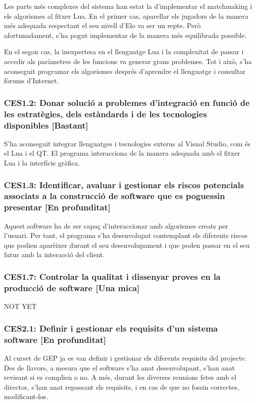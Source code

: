 \documentclass[a4paper]{article}
\begin{document}
Les parts més complexes del sistema han estat la d'implementar el matchmaking i els algorismes al fitxer Lua. En el primer cas, aparellar els jugadors de la manera més adequada respectant el seu nivell d'Elo va ser un repte. Però afortunadament, s'ha pogut implementar de la manera més equilibrada possible.

En el segon cas, la inexpertesa en el llenguatge Lua i la complexitat de passar i accedir als paràmetres de les funcions va generar grans problemes. Tot i això, s'ha aconseguit programar els algorismes després d'aprendre el llenguatge i consultar fòrums d'Internet.

\subsubsection*{CES1.2: Donar solució a problemes d'integració en funció de les estratègies, dels estàndards i de les tecnologies disponibles [Bastant]}

S'ha aconseguit integrar llenguatges i tecnologies externs al Visual Studio, com és el Lua i el QT. El programa interacciona de la manera adequada amb el fitxer Lua i la interfície gràfica. 

\subsubsection*{CES1.3: Identificar, avaluar i gestionar els riscos potencials associats a la construcció de software que es poguessin presentar [En profunditat]}

Aquest software ha de ser capaç d'interaccionar amb algorismes creats per l'usuari. Per tant, el programa s'ha desenvolupat contemplant els diferents riscos que podien aparèixer durant el seu desenvolupament i que poden passar en el seu futur amb la interacció del client.

\subsubsection*{CES1.7: Controlar la qualitat i dissenyar proves en la producció de software [Una mica]}

NOT YET

\subsubsection*{CES2.1: Definir i gestionar els requisits d'un sistema software [En profunditat]}

Al curset de GEP ja es van definir i gestionar els diferents requisits del projecte. Des de llavors, a mesura que el software s'ha anat desenvolupant, s'han anat revisant si es complien o no. A més, durant les diverses reunions fetes amb el director, s'han anat repassant els requisits, i en cas de que no fossin correctes, modificant-los.
\end{document}
